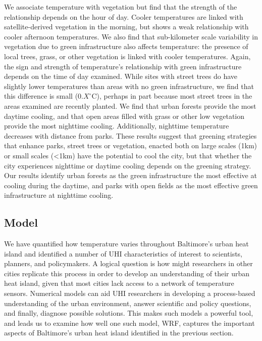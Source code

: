 \documentclass[draft,linenumbers]{agujournal}
\begin{document}
We associate temperature with vegetation but find that the strength of the relationship depends on the hour of day. Cooler temperatures are linked with satellite-derived vegetation in the morning, but shows a weak relationship with cooler afternoon temperatures.  We also find that sub-kilometer scale variability in vegetation due to green infrastructure also affects temperature: the presence of local trees, grass, or other vegetation is linked with cooler temperatures. Again, the sign and strength of temperature's relationship with green infrastructure depends on the time of day examined. While sites with street trees do have slightly lower temperatures than areas with no green infrastructure, we find that this difference is small ($0.X^\circ$C), perhaps in part because most street trees in the areas examined are recently planted. We find that urban forests provide the most daytime cooling, and that open areas filled with grass or other low vegetation provide the most nighttime cooling. Additionally, nighttime temperature decreases with distance from parks. These results suggest that greening strategies that enhance parks, street trees or vegetation, enacted both on large scales (1km) or small scales (<1km) have the potential to cool the city, but that whether the city experiences nighttime or daytime cooling depends on the greening strategy. Our results identify urban forests as the green infrastructure the most effective at cooling during the daytime, and parks with open fields as the most effective green infrastructure at nighttime cooling. 
 
\subsection{Model}
We have quantified how temperature varies throughout Baltimore's urban heat island and identified a number of UHI characteristics of interest to scientists, planners, and policymakers. A logical question is how might researchers in other cities replicate this process in order to develop an understanding of their urban heat island, given that most cities lack access to a network of temperature sensors. Numerical models can aid UHI researchers in developing a process-based understanding of the urban environment, answer scientific and policy questions, and finally, diagnose possible solutions. This makes such models a powerful tool, and leads us to examine how well one such model, WRF, captures the important aspects of Baltimore's urban heat island identified in the previous section. 
\end{document}
